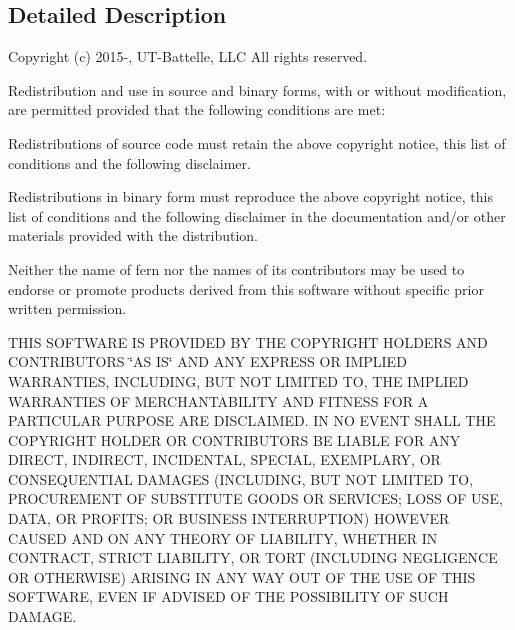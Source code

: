 \subsection{Detailed Description}


 Copyright (c) 2015-\/, U\+T-\/\+Battelle, L\+L\+C All rights reserved.

Redistribution and use in source and binary forms, with or without modification, are permitted provided that the following conditions are met\+:

Redistributions of source code must retain the above copyright notice, this list of conditions and the following disclaimer.

Redistributions in binary form must reproduce the above copyright notice, this list of conditions and the following disclaimer in the documentation and/or other materials provided with the distribution.

Neither the name of fern nor the names of its contributors may be used to endorse or promote products derived from this software without specific prior written permission.

T\+H\+I\+S S\+O\+F\+T\+W\+A\+R\+E I\+S P\+R\+O\+V\+I\+D\+E\+D B\+Y T\+H\+E C\+O\+P\+Y\+R\+I\+G\+H\+T H\+O\+L\+D\+E\+R\+S A\+N\+D C\+O\+N\+T\+R\+I\+B\+U\+T\+O\+R\+S \char`\"{}\+A\+S I\+S\char`\"{} A\+N\+D A\+N\+Y E\+X\+P\+R\+E\+S\+S O\+R I\+M\+P\+L\+I\+E\+D W\+A\+R\+R\+A\+N\+T\+I\+E\+S, I\+N\+C\+L\+U\+D\+I\+N\+G, B\+U\+T N\+O\+T L\+I\+M\+I\+T\+E\+D T\+O, T\+H\+E I\+M\+P\+L\+I\+E\+D W\+A\+R\+R\+A\+N\+T\+I\+E\+S O\+F M\+E\+R\+C\+H\+A\+N\+T\+A\+B\+I\+L\+I\+T\+Y A\+N\+D F\+I\+T\+N\+E\+S\+S F\+O\+R A P\+A\+R\+T\+I\+C\+U\+L\+A\+R P\+U\+R\+P\+O\+S\+E A\+R\+E D\+I\+S\+C\+L\+A\+I\+M\+E\+D. I\+N N\+O E\+V\+E\+N\+T S\+H\+A\+L\+L T\+H\+E C\+O\+P\+Y\+R\+I\+G\+H\+T H\+O\+L\+D\+E\+R O\+R C\+O\+N\+T\+R\+I\+B\+U\+T\+O\+R\+S B\+E L\+I\+A\+B\+L\+E F\+O\+R A\+N\+Y D\+I\+R\+E\+C\+T, I\+N\+D\+I\+R\+E\+C\+T, I\+N\+C\+I\+D\+E\+N\+T\+A\+L, S\+P\+E\+C\+I\+A\+L, E\+X\+E\+M\+P\+L\+A\+R\+Y, O\+R C\+O\+N\+S\+E\+Q\+U\+E\+N\+T\+I\+A\+L D\+A\+M\+A\+G\+E\+S (I\+N\+C\+L\+U\+D\+I\+N\+G, B\+U\+T N\+O\+T L\+I\+M\+I\+T\+E\+D T\+O, P\+R\+O\+C\+U\+R\+E\+M\+E\+N\+T O\+F S\+U\+B\+S\+T\+I\+T\+U\+T\+E G\+O\+O\+D\+S O\+R S\+E\+R\+V\+I\+C\+E\+S; L\+O\+S\+S O\+F U\+S\+E, D\+A\+T\+A, O\+R P\+R\+O\+F\+I\+T\+S; O\+R B\+U\+S\+I\+N\+E\+S\+S I\+N\+T\+E\+R\+R\+U\+P\+T\+I\+O\+N) H\+O\+W\+E\+V\+E\+R C\+A\+U\+S\+E\+D A\+N\+D O\+N A\+N\+Y T\+H\+E\+O\+R\+Y O\+F L\+I\+A\+B\+I\+L\+I\+T\+Y, W\+H\+E\+T\+H\+E\+R I\+N C\+O\+N\+T\+R\+A\+C\+T, S\+T\+R\+I\+C\+T L\+I\+A\+B\+I\+L\+I\+T\+Y, O\+R T\+O\+R\+T (I\+N\+C\+L\+U\+D\+I\+N\+G N\+E\+G\+L\+I\+G\+E\+N\+C\+E O\+R O\+T\+H\+E\+R\+W\+I\+S\+E) A\+R\+I\+S\+I\+N\+G I\+N A\+N\+Y W\+A\+Y O\+U\+T O\+F T\+H\+E U\+S\+E O\+F T\+H\+I\+S S\+O\+F\+T\+W\+A\+R\+E, E\+V\+E\+N I\+F A\+D\+V\+I\+S\+E\+D O\+F T\+H\+E P\+O\+S\+S\+I\+B\+I\+L\+I\+T\+Y O\+F S\+U\+C\+H D\+A\+M\+A\+G\+E.

